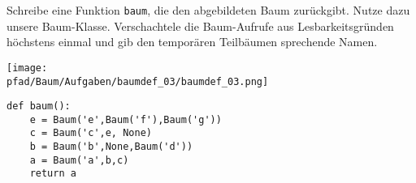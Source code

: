 \question[3]
Schreibe eine Funktion \texttt{baum}, die den abgebildeten Baum zurückgibt.
Nutze dazu unsere Baum-Klasse.
Verschachtele die Baum-Aufrufe aus Lesbarkeitsgründen
höchstens einmal und gib den temporären Teilbäumen sprechende Namen.

\texttt{[image: \\pfad/Baum/Aufgaben/baumdef\_03/baumdef\_03.png]}

\begin{solutionbox}{5cm}
\begin{lstlisting}
def baum():
    e = Baum('e',Baum('f'),Baum('g'))
    c = Baum('c',e, None)
    b = Baum('b',None,Baum('d'))
    a = Baum('a',b,c)
    return a
\end{lstlisting}
\end{solutionbox}
